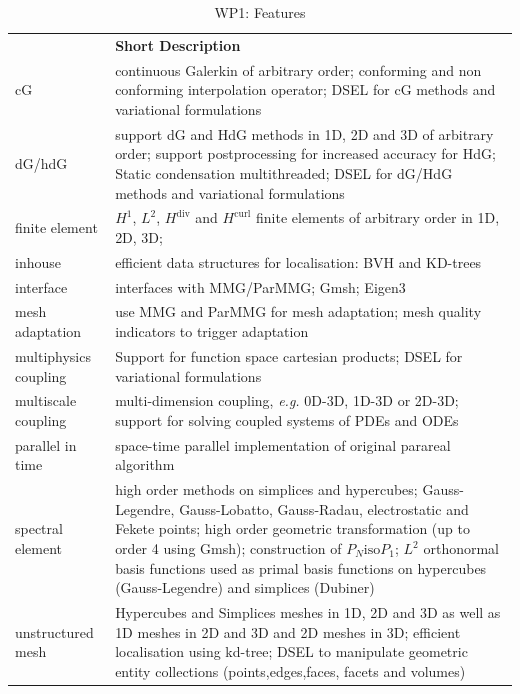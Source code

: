 \begin{table}[!ht]
    \centering
    {
        \setlength{\parindent}{0pt}
        \def\arraystretch{1.25}
        {
            \fontsize{9}{11}\selectfont
            \begin{tabular}{!{\color{numpexgray}\vrule}p{.25\linewidth}!{\color{numpexgray}\vrule}p{.6885\linewidth}!{\color{numpexgray}\vrule}}

     &  {\rule{0pt}{2.5ex}\color{white}\bf Short Description }\\

    cG&  continuous Galerkin of arbitrary order; conforming and non conforming interpolation operator;  \ac{DSEL} for cG methods and variational formulations \\
    dG/hdG & support dG and HdG methods in 1D, 2D and 3D of arbitrary order; support postprocessing for increased accuracy for HdG; Static condensation multithreaded; \ac{DSEL} for dG/HdG methods and variational formulations\\
    finite element & $H^1$, $L^2$, $H^\mathrm{div}$ and $H^\mathrm{curl}$ finite elements of arbitrary order in 1D, 2D, 3D; \\
    inhouse & efficient data structures for localisation: BVH and KD-trees \\
    interface & interfaces with MMG/ParMMG; Gmsh; Eigen3 \\
    mesh adaptation & use MMG and ParMMG for mesh adaptation; mesh quality indicators to trigger adaptation\\
    multiphysics coupling & Support for function space cartesian products; \ac{DSEL} for variational formulations  \\
    multiscale coupling & multi-dimension coupling, \textit{e.g.} 0D-3D, 1D-3D or 2D-3D; support for solving coupled systems of PDEs and ODEs\\
    parallel in time & space-time parallel implementation of original parareal algorithm \\
    spectral element & high order methods on simplices and hypercubes; Gauss-Legendre, Gauss-Lobatto, Gauss-Radau, electrostatic and Fekete points;  high order geometric transformation (up to order 4 using Gmsh); construction of $P_N \mathrm{iso} P_1$; $L^2$ orthonormal basis functions used as primal basis functions on hypercubes (Gauss-Legendre) and simplices (Dubiner) \\
    unstructured mesh & Hypercubes and Simplices meshes in 1D, 2D and 3D as well as 1D meshes in 2D and 3D and 2D meshes in 3D; efficient localisation using kd-tree; \ac{DSEL} to manipulate geometric entity collections (points,edges,faces, facets and volumes)\\
\hline
\end{tabular}
        }
    }
    \caption{WP1: \Feelpp Features}
    \label{tab:WP1:Feelpp:features}
\end{table}


